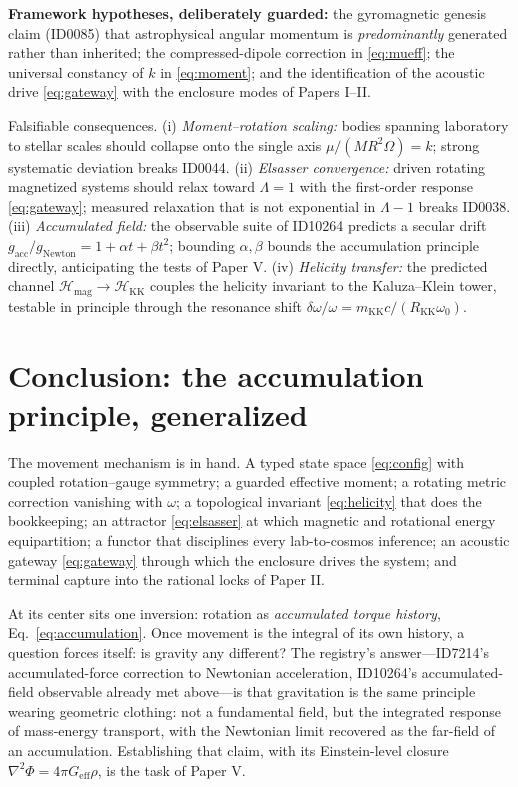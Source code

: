\documentclass[11pt]{article}
\theoremstyle{remark}
\begin{document}
\textbf{Framework hypotheses, deliberately guarded:} the gyromagnetic genesis claim (ID0085) that astrophysical angular momentum is \emph{predominantly} generated rather than inherited; the compressed-dipole correction in \eqref{eq:mueff}; the universal constancy of $k$ in \eqref{eq:moment}; and the identification of the acoustic drive \eqref{eq:gateway} with the enclosure modes of Papers I--II.

Falsifiable consequences. (i) \emph{Moment--rotation scaling:} bodies spanning laboratory to stellar scales should collapse onto the single axis $\mu / (MR^2\Omega) = k$; strong systematic deviation breaks ID0044. (ii) \emph{Elsasser convergence:} driven rotating magnetized systems should relax toward $\Lambda = 1$ with the first-order response \eqref{eq:gateway}; measured relaxation that is not exponential in $\Lambda - 1$ breaks ID0038. (iii) \emph{Accumulated field:} the observable suite of ID10264 predicts a secular drift $g_{\mathrm{acc}}/g_{\mathrm{Newton}} = 1 + \alpha t + \beta t^2$; bounding $\alpha, \beta$ bounds the accumulation principle directly, anticipating the tests of Paper V. (iv) \emph{Helicity transfer:} the predicted channel $\mathcal{H}_{\mathrm{mag}} \to \mathcal{H}_{\mathrm{KK}}$ couples the helicity invariant to the Kaluza--Klein tower, testable in principle through the resonance shift $\delta\omega/\omega = m_{\mathrm{KK}}c/(R_{\mathrm{KK}}\omega_0)$.

\section{Conclusion: the accumulation principle, generalized}
\label{sec:conclusion}

The movement mechanism is in hand. A typed state space \eqref{eq:config} with coupled rotation--gauge symmetry; a guarded effective moment; a rotating metric correction vanishing with $\omega$; a topological invariant \eqref{eq:helicity} that does the bookkeeping; an attractor \eqref{eq:elsasser} at which magnetic and rotational energy equipartition; a functor that disciplines every lab-to-cosmos inference; an acoustic gateway \eqref{eq:gateway} through which the enclosure drives the system; and terminal capture into the rational locks of Paper II.

At its center sits one inversion: rotation as \emph{accumulated torque history}, Eq.~\eqref{eq:accumulation}. Once movement is the integral of its own history, a question forces itself: is gravity any different? The registry's answer---ID7214's accumulated-force correction to Newtonian acceleration, ID10264's accumulated-field observable already met above---is that gravitation is the same principle wearing geometric clothing: not a fundamental field, but the integrated response of mass-energy transport, with the Newtonian limit recovered as the far-field of an accumulation. Establishing that claim, with its Einstein-level closure $\nabla^2\Phi = 4\pi G_{\mathrm{eff}}\rho$, is the task of Paper V.
\end{document}
